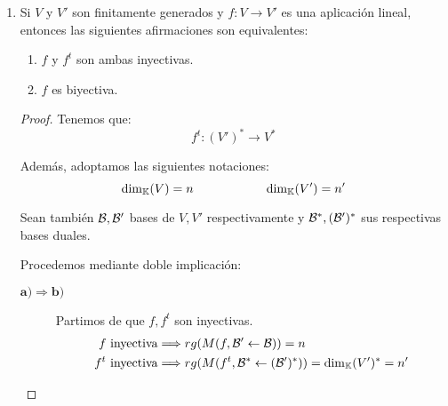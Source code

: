 \documentclass[12pt]{article}
\begin{document}
\begin{ejercicio}
\begin{enumerate}
\begin{proof}
\begin{description}
            Como $v\in \cc{L}(\{w_1,\dots,w_k\})$, es combinación lineal de los vectores del sistema generador. Por tanto,
            \begin{equation*}
                v=a_1w_1 + \dots + a_kw_k \hspace{2cm} a_i\in \bb{K}
            \end{equation*}
            Aplicando $f$, sabiendo que esta es una aplicación lineal, y que $f(v)\neq 0$; tenemos que:
            \begin{equation*}
                f(v)=f(a_1w_1 + \dots + a_kw_k) = a_1f(w_1) + \dots + a_kf(w_k) \neq 0
            \end{equation*}

            Por tanto, $f(v)=0\Longleftrightarrow v=0$. Por tanto, $Ker(f)=0$ y por tanto $f$ es un monomorfismo. Por tanto, queda demostrado que $\{f(w_1),\dots,f(w_k)\} \subset V'$ es linealmente independiente.
        \end{description}
        \end{proof}

        \item Si $V$ y $V'$ son finitamente generados y $f:V\to V'$ es una aplicación lineal, entonces las siguientes afirmaciones son equivalentes:
        \begin{enumerate}
            \item $f$ y $f^t$ son ambas inyectivas.
            \item $f$ es biyectiva.
        \end{enumerate}
        \begin{proof}
        Tenemos que:
        \begin{equation*}
            f^t:(V')^\ast \longrightarrow V^\ast
        \end{equation*}

        Además, adoptamos las siguientes notaciones:
        \begin{equation*}
            \dim_{\mathbb{K}}(V)=n \hspace{2cm} \dim_{\mathbb{K}}(V')=n'
        \end{equation*}

        Sean también $\mathcal{B}, \mathcal{B}'$ bases de $V,V'$ respectivamente y $\mathcal{B}^\ast, (\mathcal{B}')^\ast$ sus respectivas bases duales.
        
        Procedemos mediante doble implicación:
        \begin{description}
            \item [$\mathbf{a)\Longrightarrow b)}$]
            Partimos de que $f,f^t$ son inyectivas.
            \begin{equation*}\begin{split}
                f\text{ inyectiva} &\Longrightarrow rg(M(f,\mathcal{B}'\leftarrow \mathcal{B})) = n\\
                f^t\text{ inyectiva} &\Longrightarrow rg(M(f^t,\mathcal{B}^\ast\leftarrow (\mathcal{B}')^\ast)) = \dim_{\mathbb{K}}(V')^\ast = n'
            \end{split}\end{equation*}


\end{description}
\end{proof}
\end{enumerate}
\end{ejercicio}
\end{document}
